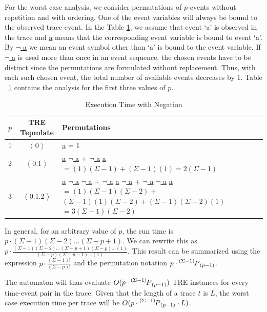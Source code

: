 \documentclass[]{sigplanconf}
\newcommand\Myperm[2][n]{\prescript{#1\mkern-2.5mu}{}P_{#2}}
\begin{document}
For the worst case analysis, we consider permutations of $p$ events without repetition and with ordering. One of the event variables will always be bound to the observed trace event. In the Table \ref{Exec-noneg}, we assume that event `a' is observed in the trace and \underline{a} means that the corresponding event variable is bound to event `a'. By \underline{$\neg$ a} we mean an event symbol other than `a' is bound to the event variable. If \underline{$\neg$ a} is used more than once in an event sequence, the chosen events have to be distinct since the permutations are formulated without replacement. Thus, with each such chosen event, the total number of available events decreases by 1. Table ~\ref{Exec-noneg} contains the analysis for the first three values of $p$.

\begin{table}[ht]
  \centering
  \begin{tabular}{|c|c|l|}
    \hline
    \textbf{$p$} & \textbf{TRE Tepmlate} & \textbf{Permutations}\\
    \hline
      1 & $\langle$ 0 $\rangle$ & \underline{a} = 1 \\
    \hline
      2 & $\langle$ 0.1 $\rangle$ &
      \makecell[l]{\underline{a} \underline{$\neg$ a} + \underline{$\neg$ a} \underline{a} \\
      $= (1)(\Sigma - 1) + (\Sigma - 1)(1) = 2(\Sigma - 1)$ } \\
    \hline
      3 & $\langle$ 0.1.2 $\rangle$ &
      \makecell[l]{\underline{a} \underline{$\neg$ a} \underline{$\neg$ a} + \underline{$\neg$ a} \underline{a} \underline{$\neg$ a} + \underline{$\neg$ a} \underline{$\neg$ a} \underline{a} \\
      $= (1)(\Sigma - 1)(\Sigma - 2) +$ \\
      $(\Sigma - 1)(1)(\Sigma - 2) + (\Sigma - 1)(\Sigma - 2)(1) $ \\
      $= 3(\Sigma - 1)(\Sigma - 2) $ } \\
    \hline
  \end{tabular}
\caption{Execution Time with Negation} \label{Exec-noneg}
\end{table}

\begin{sloppypar}
In general, for an arbitrary value of $p$, the run time is ${p \cdot (\Sigma - 1)(\Sigma - 2) \ldots (\Sigma - p + 1)}$.
We can rewrite this as
${p \cdot \frac{(\Sigma - 1)(\Sigma - 2) \ldots (\Sigma - p + 1)(\Sigma - p) \ldots (1)}{(\Sigma - p)(\Sigma - p - 1) \ldots (1)}}$.
This result can be summarized using the expression ${p \cdot \frac{(\Sigma - 1)!}{(\Sigma - p)!}}$ and the permutation notation ${p \cdot \Myperm[(\Sigma - 1)]{(p - 1)}}$.

The automaton will thus evaluate $O(p \cdot \Myperm[(\Sigma - 1)]{(p - 1)})$ TRE instances for every time-event pair in the trace. Given that the length of a trace $t$ is $L$, the worst case execution time per trace will be
$O(p \cdot \Myperm[(\Sigma - 1)]{(p - 1)} \cdot L)$.
\end{sloppypar}
\end{document}
